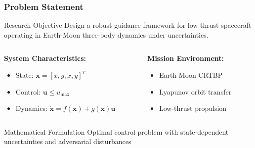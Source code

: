 \documentclass[
    11pt, %
    aspectratio=169, %
]{beamer}
\begin{document}
\begin{frame}
	\frametitle{Problem Statement}
    \vspace{-0.35cm}
	\begin{block}{Research Objective}
		Design a robust guidance framework for low-thrust spacecraft operating in Earth-Moon three-body dynamics under uncertainties.
	\end{block}
	
	\begin{columns}[t]
		\begin{column}{0.5\textwidth}
			\textbf{System Characteristics:}
			\begin{itemize}
				\item State: $\mathbf{x} = [x, y, \dot{x}, \dot{y}]^T$
				\item Control: $\mathbf{u} \leq u_{\max}$
				\item Dynamics: $\dot{\mathbf{x}} = f(\mathbf{x}) + g(\mathbf{x})\mathbf{u}$
			\end{itemize}
		\end{column}
		\begin{column}{0.5\textwidth}
			\textbf{Mission Environment:}
			\begin{itemize}
				\item Earth-Moon CRTBP
				\item Lyapunov orbit transfer
				\item Low-thrust propulsion
			\end{itemize}
		\end{column}
	\end{columns}
	
    \begin{minipage}
        {0.93\textwidth}
            \begin{exampleblock}{Mathematical Formulation}
		Optimal control problem with state-dependent uncertainties and adversarial disturbances
	\end{exampleblock}
    \end{minipage}
\end{frame}
\end{document}
